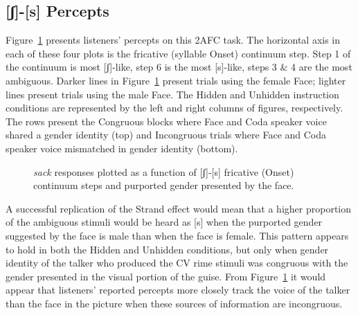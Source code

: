 \documentclass[
  letterpaper,
  DIV=11,
  numbers=noendperiod]{scrartcl}
\begin{document}
\subsection{{[}ʃ{]}-{[}s{]} Percepts}\label{sec-results-fricative}

Figure~\ref{fig-scurve} presents listeners' percepts on this 2AFC task.
The horizontal axis in each of these four plots is the fricative
(syllable Onset) continuum step. Step 1 of the continuum is most
{[}ʃ{]}-like, step 6 is the most {[}s{]}-like, steps 3 \& 4 are the most
ambiguous. Darker lines in Figure~\ref{fig-scurve} present trials using
the female Face; lighter lines present trials using the male Face. The
Hidden and Unhidden instruction conditions are represented by the left
and right columns of figures, respectively. The rows present the
Congruous blocks where Face and Coda speaker voice shared a gender
identity (top) and Incongruous trials where Face and Coda speaker voice
mismatched in gender identity (bottom).

\begin{figure}


\caption{\label{fig-scurve}\emph{sack} responses plotted as a function
of {[}ʃ{]}-{[}s{]} fricative (Onset) continuum steps and purported
gender presented by the face.}

\end{figure}%

A successful replication of the Strand effect would mean that a higher
proportion of the ambiguous stimuli would be heard as {[}s{]} when the
purported gender suggested by the face is male than when the face is
female. This pattern appears to hold in both the Hidden and Unhidden
conditions, but only when gender identity of the talker who produced the
CV rime stimuli was congruous with the gender presented in the visual
portion of the guise. From Figure~\ref{fig-scurve} it would appear that
listeners' reported percepts more closely track the voice of the talker
than the face in the picture when these sources of information are
incongruous.
\end{document}
